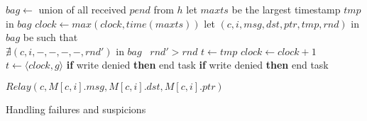 \begin{algorithm}[t]
\begin{distribalgo}[1]
\vspace{2.0mm}		
		\STATE $bag \leftarrow$ union of all received $pend$ from $h$
		\STATE let $maxts$ be the largest timestamp $tmp$ in $bag$
		\STATE $clock \leftarrow max(clock, time(maxts))$
			\STATE let $(c,i,msg,dst,ptr,tmp,rnd)$ in $bag$ be such that \\
				\hfill $\nexists (c,i,-,-,-,-,rnd')$ in $bag$ \band\ $rnd' > rnd$
				\STATE $t \leftarrow tmp$
			\ELSE
				\STATE $clock \leftarrow clock + 1$
				\STATE $t \leftarrow \langle clock,g \rangle$
			\ENDIF
				\STATE {}
				\STATE {}
				\STATE \textbf{if} write denied \textbf{then} end task
			\ENDINDENT	
		\ELSE
				\STATE {}
				\STATE \textbf{if} write denied \textbf{then} end task
			\ENDINDENT	
		\ENDIF
		\ENDINDENT
		
\ENDWHEN
\vspace{2.0mm}

		\STATE $Relay(c,M[c,i].msg,M[c,i].dst,M[c,i].ptr)$
	\ENDINDENT
\ENDWHEN
\vspace{2.0mm}

\caption{Handling failures and suspicions}
\label{alg:failures}
\end{distribalgo}
\end{algorithm}
